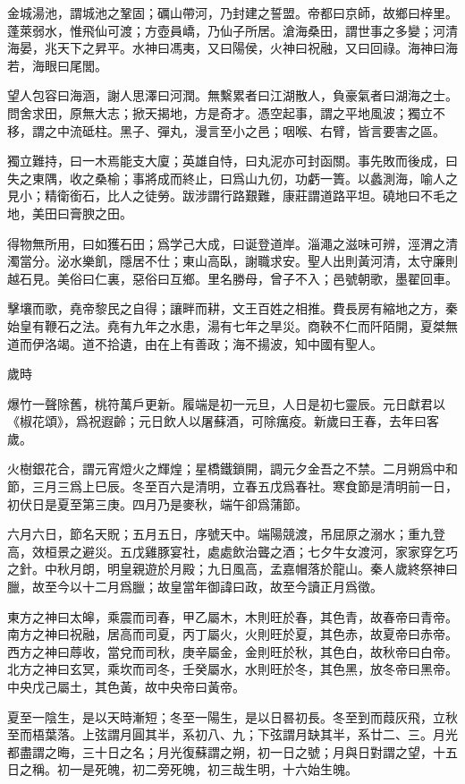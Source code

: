 \documentclass[12pt,a4paper]{ctexbook}
\begin{document}
金城湯池，謂城池之鞏固；礪山帶河，乃封建之誓盟。帝都曰京師，故鄉曰梓里。蓬萊弱水，惟飛仙可渡；方壺員嶠，乃仙子所居。滄海桑田，謂世事之多變；河清海晏，兆天下之昇平。水神曰馮夷，又曰陽侯，火神曰祝融，又曰回祿。海神曰海若，海眼曰尾閭。\par
望人包容曰海涵，謝人思澤曰河潤。無繫累者曰江湖散人，負豪氣者曰湖海之士。問舍求田，原無大志；掀天揭地，方是奇才。憑空起事，謂之平地風波；獨立不移，謂之中流砥柱。黑子、彈丸，漫言至小之邑；咽喉、右臂，皆言要害之區。\par
獨立難持，曰一木焉能支大廈；英雄自恃，曰丸泥亦可封函關。事先敗而後成，曰失之東隅，收之桑榆；事將成而終止，曰爲山九仞，功虧一簣。以蠡測海，喻人之見小；精衛銜石，比人之徒勞。跋涉謂行路艱難，康莊謂道路平坦。磽地曰不毛之地，美田曰膏腴之田。\par
得物無所用，曰如獲石田；爲学己大成，曰诞登道岸。淄澠之滋味可辨，涇渭之清濁當分。泌水樂飢，隱居不仕；東山高臥，謝職求安。聖人出則黃河清，太守廉則越石見。美俗曰仁裏，惡俗曰互鄉。里名勝母，曾子不入；邑號朝歌，墨翟回車。\par
擊壤而歌，堯帝黎民之自得；讓畔而耕，文王百姓之相推。費長房有縮地之方，秦始皇有鞭石之法。堯有九年之水患，湯有七年之旱災。商鞅不仁而阡陌開，夏桀無道而伊洛竭。道不拾遺，由在上有善政；海不揚波，知中國有聖人。\par
歲時\par
爆竹一聲除舊，桃符萬戶更新。履端是初一元旦，人日是初七靈辰。元日獻君以《椒花頌》，爲祝遐齡；元日飲人以屠蘇酒，可除癘疫。新歲曰王春，去年曰客歲。\par
火樹銀花合，謂元宵燈火之輝煌；星橋鐵鎖開，調元夕金吾之不禁。二月朔爲中和節，三月三爲上巳辰。冬至百六是清明，立春五戊爲春社。寒食節是清明前一日，初伏日是夏至第三庚。四月乃是麥秋，端午卻爲蒲節。\par
六月六日，節名天貺；五月五日，序號天中。端陽競渡，吊屈原之溺水；重九登高，效桓景之避災。五戊雞豚宴社，處處飲治聾之酒；七夕牛女渡河，家家穿乞巧之針。中秋月朗，明皇親遊於月殿；九日風高，孟嘉帽落於龍山。秦人歲終祭神曰臘，故至今以十二月爲臘；故皇當年御諱曰政，故至今讀正月爲徵。\par
東方之神曰太皞，乘震而司春，甲乙屬木，木則旺於春，其色青，故春帝曰青帝。南方之神曰祝融，居高而司夏，丙丁屬火，火則旺於夏，其色赤，故夏帝曰赤帝。西方之神曰蓐收，當兌而司秋，庚辛屬金，金則旺於秋，其色白，故秋帝曰白帝。北方之神曰玄冥，乘坎而司冬，壬癸屬水，水則旺於冬，其色黑，放冬帝曰黑帝。中央戊己屬土，其色黃，故中央帝曰黃帝。\par
夏至一陰生，是以天時漸短；冬至一陽生，是以日晷初長。冬至到而葭灰飛，立秋至而梧葉落。上弦謂月圓其半，系初八、九；下弦謂月缺其半，系廿二、三。月光都盡謂之晦，三十日之名；月光復蘇謂之朔，初一日之號；月與日對謂之望，十五日之稱。初一是死魄，初二旁死魄，初三哉生明，十六始生魄。\par
\end{document}
